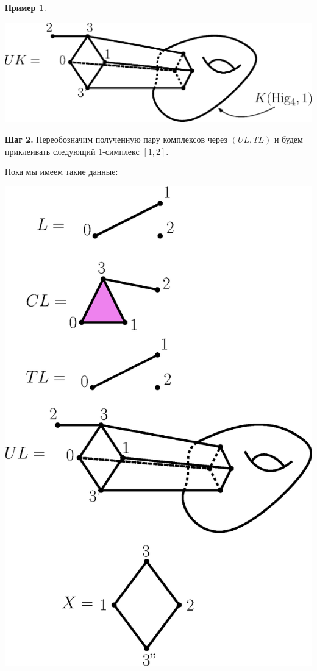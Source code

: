 \documentclass[14pt, dvipsnames]{extarticle}
\theoremstyle{definition}
\newtheorem{example}{Пример}
\theoremstyle{remark}
\begin{document}
\begin{example}
\begin{center}
\includegraphics[scale=0.5]{pict4}
\end{center}





{\bf Шаг 2.} Переобозначим полученную пару комплексов через $(UL, TL)$ и будем приклеивать следующий 1-симплекс $[1, 2]$.

Пока мы имеем такие данные:   

\begin{center}
\includegraphics[scale=0.4]{pict5}
\end{center}
 


\end{example}
\end{document}
